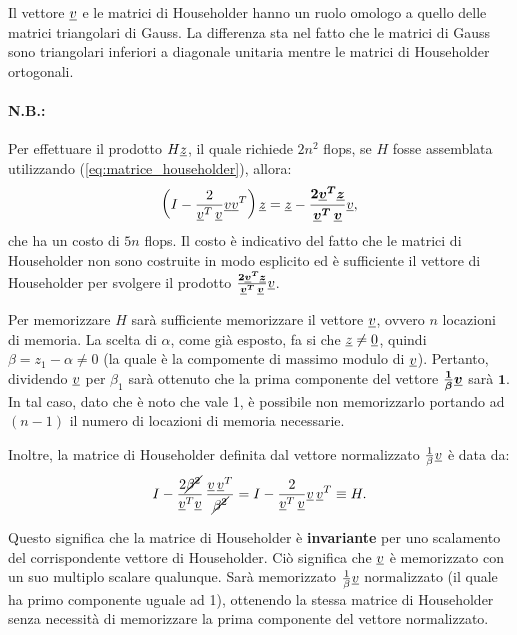 Il vettore $\uline v$ e le matrici di Householder hanno un ruolo omologo a quello delle matrici triangolari di Gauss. La differenza sta nel fatto che le matrici di Gauss sono triangolari inferiori a diagonale unitaria mentre le matrici di Householder ortogonali.

\paragraph{N.B.:} Per effettuare il prodotto $H\uline z$, il quale richiede $2n^2$ flops, se $H$ fosse assemblata utilizzando (\ref{eq:matrice_householder}), allora: 
\begin{equation*}
    \left(I-\frac{2}{\uline v^T\,\uline v}\uline v\uline v^T\right)\uline z=\uline z-\boldsymbol{\frac{2\uline v^T\uline z}{\uline v^T\,\uline v}}\uline v,
\end{equation*}
che ha un costo di $5n$ flops. Il costo è indicativo del fatto che le matrici di Householder non sono costruite in modo esplicito ed è sufficiente il vettore di Householder per svolgere il prodotto $\boldsymbol{\frac{2\uline v^T\uline z}{\uline v^T\,\uline v}}\uline v$.

Per memorizzare $H$ sarà sufficiente memorizzare il vettore $\uline v$, ovvero $n$ locazioni di memoria. La scelta di $\alpha$, come già esposto, fa si che $\uline z\neq\uline 0$, quindi $\beta = z_1-\alpha\neq 0$ (la quale è la compomente di massimo modulo di $\uline v$). Pertanto, dividendo $\uline v$ per $\beta_1$ sarà ottenuto che la prima componente del vettore $\boldsymbol{\frac{1}{\beta}\uline v}$ sarà $\boldsymbol 1$. In tal caso, dato che è noto che vale 1, è possibile non memorizzarlo portando ad $(n-1)$ il numero di locazioni di memoria necessarie.

Inoltre, la matrice di Householder definita dal vettore normalizzato $\frac{1}{\beta}\uline v$ è data da:
\begin{equation}\label{eq:matrHHNorm}
    I-\frac{2\cancel{\beta^2}}{\uline v^T\uline v}\, \frac{\uline v\,\uline v^T}{\cancel{\beta^2}} = I - \frac{2}{\uline v^T\,\uline v}\uline v\,\uline v^T\equiv H.
\end{equation}

Questo significa che la matrice di Householder è \textbf{invariante} per uno scalamento del corrispondente vettore di Householder. Ciò significa che $\uline v$ è memorizzato con un suo multiplo scalare qualunque. Sarà memorizzato $\frac{1}{\beta}\uline v$ normalizzato (il quale ha primo componente uguale ad 1), ottenendo la stessa matrice di Householder senza necessità di memorizzare la prima componente del vettore normalizzato.

